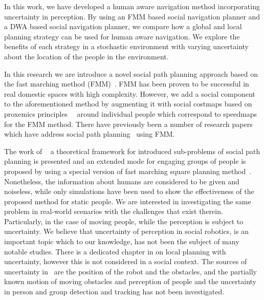 In this work, we have developed a human aware navigation method incorporating uncertainty in perception. By using an FMM based social navigation planner and a DWA based social navigation planner, we compare how a global and local planning strategy can be used for human aware navigation. We explore the benefits of each strategy in a stochastic environment with varying uncertainty about the location of the people in the environment.


In this research we are introduce a novel social path planning approach based on the fast marching method (FMM)~\cite{sethian1999fast}. FMM has been proven to be successful in real domestic spaces with high complexity\cite{ventura2015}. However, we add a social component to the aforementioned method by augmenting it with social costmaps \textemdash based on proxemics principles~\cite{kirby2009companion}\textemdash~ around individual people which correspond to speedmaps for the FMM method. %
There have previously been a number of research papers which have address social path planning~\cite{gomez2014fast,gomez2013social} using FMM. %

The work of ~\cite{gomez2014fast} a theoretical framework for introduced sub-problems of social path planning is presented and an extended mode for engaging groups of people is proposed by using a special version of fast marching square planning method~\cite{valero2013fast}. Nonetheless, the information about humans are considered to be given and noiseless, while only simulations have been used to show the effectiveness of the proposed method for static people. We are interested in investigating the same problem in real-world scenarios with the challenges that exist therein. Particularly, in the case of moving people, while the perception is subject to uncertainty. 
We believe that uncertainty of perception in social robotics, is an important topic which to our knowledge, has not been the subject of many notable studies. There is a dedicated chapter in \cite{correa2014uncertainty} on local planning with uncertainty, however this is not considered in a social context. The sources of uncertainty in~\cite{correa2014uncertainty} are the position of the robot and the obstacles, and the partially known motion of moving obstacles and perception of people and the uncertainty in person and group detection and tracking has not been investigated.

